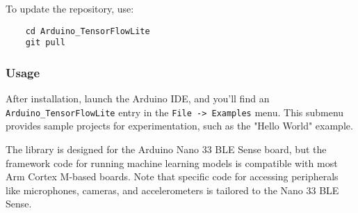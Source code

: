 To update the repository, use:
	
\begin{verbatim}
	cd Arduino_TensorFlowLite
	git pull
\end{verbatim}


\subsubsection{Usage}

After installation, launch the Arduino IDE, and you'll find an \texttt{Arduino\_TensorFlowLite} entry in the \texttt{File -> Examples} menu. This submenu provides sample projects for experimentation, such as the "Hello World" example.

The library is designed for the Arduino Nano 33 BLE Sense board, but the framework code for running machine learning models is compatible with most Arm Cortex M-based boards. Note that specific code for accessing peripherals like microphones, cameras, and accelerometers is tailored to the Nano 33 BLE Sense.

